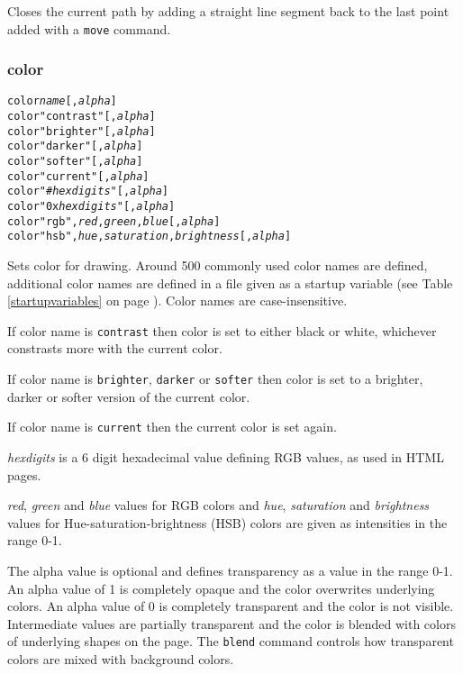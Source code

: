 Closes the current path by adding a straight line segment
back to the last point added with a \texttt{move} command.

\subsubsection{color}

\begin{alltt}
color \textit{name} [, \textit{alpha}]
color "contrast" [, \textit{alpha}]
color "brighter" [, \textit{alpha}]
color "darker" [, \textit{alpha}]
color "softer" [, \textit{alpha}]
color "current" [, \textit{alpha}]
color "\#\textit{hexdigits}" [, \textit{alpha}]
color "0x\textit{hexdigits}" [, \textit{alpha}]
color "rgb", \textit{red}, \textit{green}, \textit{blue} [, \textit{alpha}]
color "hsb", \textit{hue}, \textit{saturation}, \textit{brightness} [, \textit{alpha}]
\end{alltt}

Sets color for drawing.  Around 500 commonly used color names are defined,
additional color names are defined in a file given as a startup variable (see
Table \ref{startupvariables} on page \pageref{startupvariables}).
Color names are case-insensitive.

If color name is \texttt{contrast} then color is set to either black or white,
whichever constrasts more with the current color.

If color name is \texttt{brighter}, \texttt{darker} or \texttt{softer}
then color is set to a brighter, darker or softer version of the current color.

If color name is \texttt{current} then the current color is set again.

\textit{hexdigits} is a 6 digit hexadecimal
value defining RGB values, as used in HTML pages.

\textit{red}, \textit{green} and \textit{blue} values for RGB colors and
\textit{hue}, \textit{saturation} and \textit{brightness} values for
Hue-saturation-brightness (HSB) colors are given as intensities in the range
0-1.

The alpha value is optional and defines transparency as a value in the range
0-1.  An alpha value of 1 is completely opaque and the color overwrites
underlying colors.  An alpha value of 0 is completely transparent and the color
is not visible.  Intermediate values are partially transparent and the color is
blended with colors of underlying shapes on the page.  The
\texttt{blend} command controls how transparent colors are mixed
with background colors.

